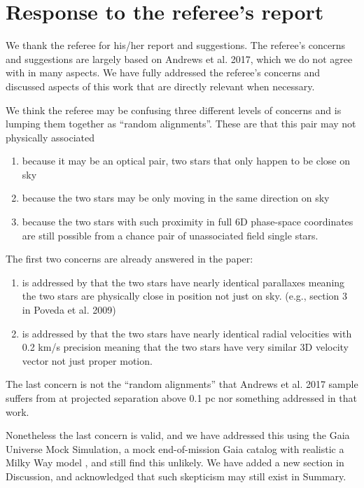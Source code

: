 \documentclass[12pt]{article}
\begin{document}
\section*{Response to the referee's report}
\label{response-to-the-referees-report}

We thank the referee for his/her report and suggestions. The referee's
concerns and suggestions are largely based on Andrews et al. 2017, which
we do not agree with in many aspects. We have fully addressed the
referee's concerns and discussed aspects of this work that are directly
relevant when necessary.

We think the referee may be confusing three different levels of concerns
and is lumping them together as ``random alignments''. These are that
this pair may not physically associated

\begin{enumerate}
\def\labelenumi{\arabic{enumi}.}
\itemsep1pt\parskip0pt
\item
  because it may be an optical pair, two stars that only happen to be
  close on sky
\item
  because the two stars may be only moving in the same direction on sky
\item
  because the two stars with such proximity in full 6D phase-space
  coordinates are still possible from a chance pair of unassociated
  field single stars.
\end{enumerate}

The first two concerns are already answered in the paper:

\begin{enumerate}
\def\labelenumi{\arabic{enumi}.}
\itemsep1pt\parskip0pt
\item
  is addressed by that the two stars have nearly identical parallaxes
  meaning the two stars are physically close in position not just on
  sky. (e.g., section 3 in Poveda et al. 2009)
\item
  is addressed by that the two stars have nearly identical radial
  velocities with 0.2 km/s precision meaning that the two stars have
  very similar 3D velocity vector not just proper motion.
\end{enumerate}

The last concern is not the ``random alignments'' that Andrews et al.
2017 sample suffers from at projected separation above 0.1 pc nor
something addressed in that work.

Nonetheless the last concern is valid, and we have addressed this using the Gaia
Universe Mock Simulation, a mock end-of-mission Gaia catalog with realistic a
Milky Way model \citep{gums}, and still find this unlikely. We have added a new
section in Discussion, and acknowledged that such skepticism may still exist in
Summary.
\end{document}
